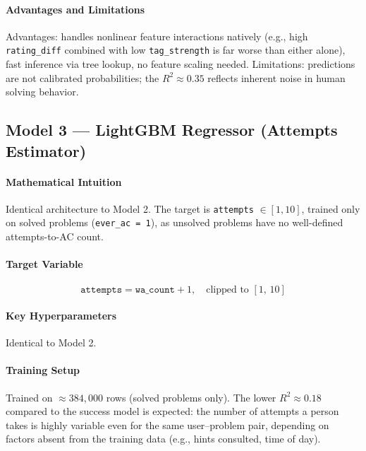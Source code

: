 \documentclass[12pt,a4paper]{article}
\begin{document}
\paragraph{Advantages and Limitations}
Advantages: handles nonlinear feature interactions natively (e.g., high
\texttt{rating\_diff} combined with low \texttt{tag\_strength} is far worse than either alone), fast inference via tree lookup, no feature scaling needed. \newline
Limitations: predictions are not calibrated probabilities; the $R^2 \approx 0.35$
reflects inherent noise in human solving behavior.

\subsection*{Model 3 --- LightGBM Regressor (Attempts Estimator)}

\paragraph{Mathematical Intuition}
Identical architecture to Model 2. The target is \texttt{attempts} $\in [1, 10]$,
trained only on solved problems (\texttt{ever\_ac = 1}), as unsolved problems have
no well-defined attempts-to-AC count.

\paragraph{Target Variable}
\[
    \texttt{attempts} = \texttt{wa\_count} + 1, \quad \text{clipped to } [1,\, 10]
\]

\paragraph{Key Hyperparameters}
Identical to Model 2.

\paragraph{Training Setup}
Trained on ${\approx}384{,}000$ rows (solved problems only). The lower $R^2
\approx 0.18$ compared to the success model is expected: the number of attempts
a person takes is highly variable even for the same user--problem pair, depending
on factors absent from the training data (e.g., hints consulted, time of day).
\end{document}
